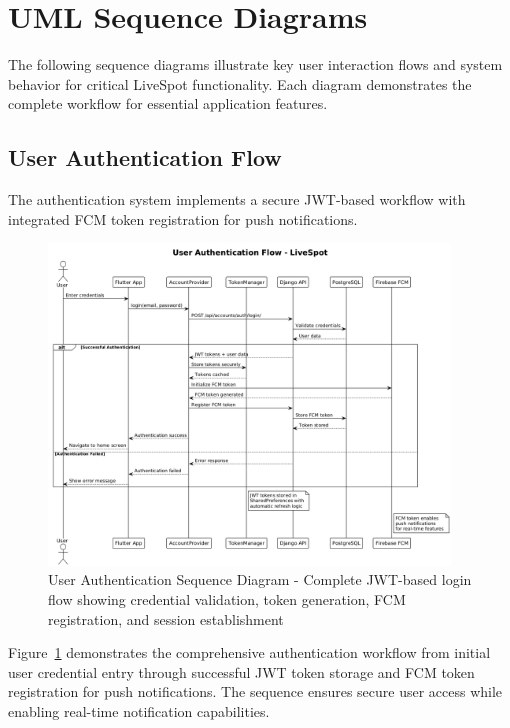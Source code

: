 \section{UML Sequence Diagrams}
\label{sec:sequence_diagrams}

The following sequence diagrams illustrate key user interaction flows and system behavior for critical LiveSpot functionality. Each diagram demonstrates the complete workflow for essential application features.

\subsection{User Authentication Flow}

The authentication system implements a secure JWT-based workflow with integrated FCM token registration for push notifications.

\begin{figure}[h!]
    \centering
    \includegraphics[width=0.95\textwidth]{figures/authentication_sequence}
    \caption{User Authentication Sequence Diagram - Complete JWT-based login flow showing credential validation, token generation, FCM registration, and session establishment}
    \label{fig:auth_sequence}
\end{figure}

Figure~\ref{fig:auth_sequence} demonstrates the comprehensive authentication workflow from initial user credential entry through successful JWT token storage and FCM token registration for push notifications. The sequence ensures secure user access while enabling real-time notification capabilities.
\clearpage
